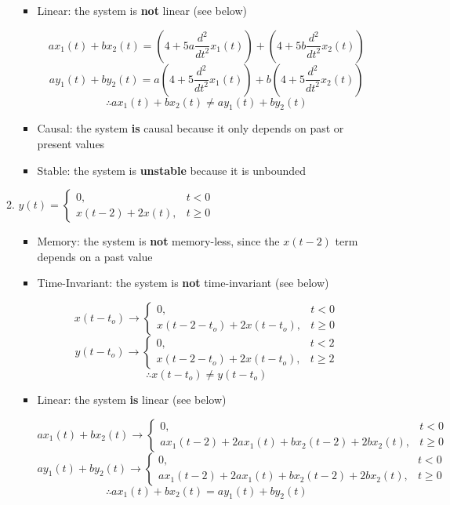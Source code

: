 \begin{enumerate}
\begin{enumerate}
\begin{itemize}
          \item Linear: the system is \textbf{not} linear (see below)

            $$ax_1(t)+bx_2(t)=\left(4+5a\dfrac{d^2}{dt^2}x_1(t)\right)+\left(4+5b\dfrac{d^2}{dt^2}x_2(t)\right)$$
            $$ay_1(t)+by_2(t)=a\left(4+5\dfrac{d^2}{dt^2}x_1(t)\right)+b\left(4+5\dfrac{d^2}{dt^2}x_2(t)\right)$$
            $$\therefore ax_1(t)+bx_2(t)\neq ay_1(t)+by_2(t)$$

          \item Causal: the system \textbf{is} causal because it only depends on past or present values

          \item Stable: the system is \textbf{unstable} because it is unbounded

        \end{itemize}

      \item $y(t)=\left\{\begin{array}{ll} 0, & t<0\\ x(t-2)+2x(t), & t\geq0\end{array}$

        \begin{itemize}

          \item Memory: the system is \textbf{not} memory-less, since the $x(t-2)$ term depends on a past value

          \item Time-Invariant: the system is \textbf{not} time-invariant (see below)

            $$x(t-t_o)\to\left\{\begin{array}{ll} 0, & t<0\\ x(t-2-t_o)+2x(t-t_o), & t\geq0\end{array}$$
            $$y(t-t_o)\to\left\{\begin{array}{ll} 0, & t<2\\ x(t-2-t_o)+2x(t-t_o), & t\geq2\end{array}$$
            $$\therefore x(t-t_o)\neq y(t-t_o)$$

          \item Linear: the system \textbf{is} linear (see below)

            $$ax_1(t)+bx_2(t)\to\left\{\begin{array}{ll} 0, & t<0\\ ax_1(t-2)+2ax_1(t)+bx_2(t-2)+2bx_2(t), & t\geq0\end{array}$$
            $$ay_1(t)+by_2(t)\to\left\{\begin{array}{ll} 0, & t<0\\ ax_1(t-2)+2ax_1(t)+bx_2(t-2)+2bx_2(t), & t\geq0\end{array}$$
              $$\therefore ax_1(t)+bx_2(t)=ay_1(t)+by_2(t)$$


\end{itemize}
\end{enumerate}
\end{enumerate}
